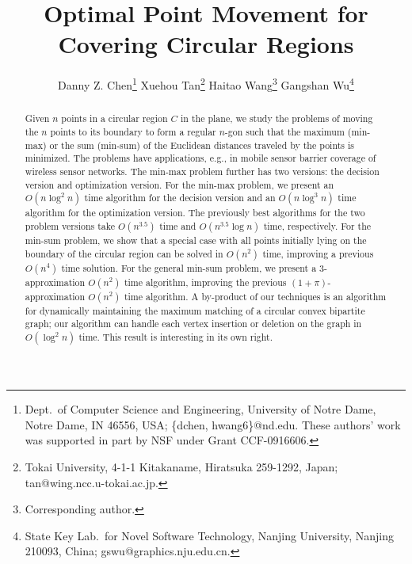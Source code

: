 \documentclass[11pt]{article}
\begin{document}
\baselineskip=14.0pt

\title{
\vspace*{-0.55in}
Optimal Point Movement for Covering Circular Regions
}



\author{
Danny Z. Chen\thanks{Dept.~of Computer Science and Engineering,
University of Notre Dame, Notre Dame, IN 46556, USA; { \{dchen,
hwang6\}@nd.edu.} These authors' work was supported in part by NSF
under Grant CCF-0916606. } \hspace*{0.1in} Xuehou Tan\thanks{Tokai
University, 4-1-1 Kitakaname, Hiratsuka 259-1292, Japan; {
tan@wing.ncc.u-tokai.ac.jp}.} \hspace*{0.1in} Haitao
Wang\footnotemark[1]  \thanks{Corresponding author.} \hspace*{0.1in}
Gangshan Wu\thanks{State Key Lab.~for Novel Software Technology,
Nanjing University, Nanjing 210093, China; {
gswu@graphics.nju.edu.cn}.}}

\date{ }
\maketitle

\pagestyle{plain}
\setcounter{page}{1}


\vspace*{-0.3in}
\begin{abstract}
Given $n$ points in a circular region $C$ in the plane, we study the problems of
moving the $n$ points to its boundary to form a regular $n$-gon such that
the maximum (min-max) or the sum (min-sum) of the Euclidean
distances traveled by the points is minimized. The problems have
applications, e.g., in mobile sensor barrier coverage of wireless
sensor networks.
The min-max problem further has two versions: the decision version and optimization
version. For the min-max problem, we present an $O(n\log^2 n)$ time
algorithm for the decision version and an $O(n\log^3 n)$ time algorithm for
the optimization version. The
previously best algorithms for the two problem versions take $O(n^{3.5})$ time
and $O(n^{3.5}\log n)$ time, respectively. For the min-sum problem,
we show that a special case with all points initially lying on the
boundary of the circular region can be solved in $O(n^2)$ time,
improving a previous $O(n^4)$ time solution. For the general
min-sum problem, we present a $3$-approximation $O(n^2)$ time
algorithm, improving the previous $(1+\pi)$-approximation $O(n^2)$ time algorithm.
A by-product of our techniques is an algorithm for dynamically
maintaining the maximum matching of a circular convex bipartite
graph; our algorithm can handle each vertex insertion or deletion on
the graph in $O(\log^2 n)$ time. This result is interesting in its
own right.
\end{abstract}
\end{document}
